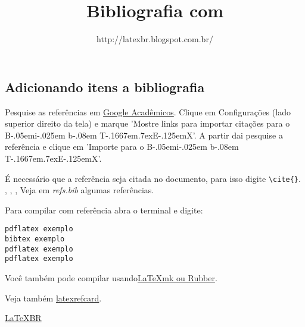 \documentclass[a4paper]{article}
\title{Bibliografia com \BibTeX}
\author{http://latexbr.blogspot.com.br/}
\date{\the\year} %
\def\BibTeX{{\rm B\kern-.05em{\sc i\kern-.025em b}\kern-.08em
    T\kern-.1667em\lower.7ex\hbox{E}\kern-.125emX}}
\begin{document}
\maketitle



\subsection{Adicionando itens a bibliografia}

Pesquise as refer\^encias em \href{http://scholar.google.com.br/schhp?hl=pt-BR}{Google Acad\^emicos}. Clique em Configura\c c\~oes (lado superior direito da tela) e marque 'Mostre links para importar cita\c c\~oes para o \BibTeX'. A partir dai pesquise a refer\^encia e clique em 'Importe para o \BibTeX'.

\'E necess\'ario que a refer\^encia seja citada no documento, para isso digite \verb|\cite{}|. \cite{oetiker}, \cite{lamport}, \cite{mittelbach}, \cite{tantau}
Veja em \textit{refs.bib} algumas refer\^encias.

Para compilar com refer\^encia abra o terminal e digite:

\begin{verbatim}
pdflatex exemplo
bibtex exemplo
pdflatex exemplo
pdflatex exemplo
\end{verbatim}

Você também pode compilar usando\href{http://latexbr.blogspot.com.br/search/label/Compilador}{LaTeXmk ou Rubber}. 

Veja também \href{http://latexbr.blogspot.com.br/2012/07/cartao-com-principais-comandos-do-latex.html}{latexrefcard}.

\href{http://latexbr.blogspot.com.br/}{LaTeXBR}



\end{document}
